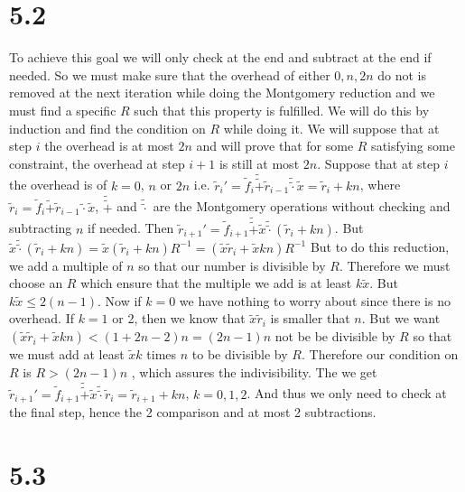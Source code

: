 \documentclass[12pt,a4paper]{article}
\begin{document}
    \section*{5.2}
    To achieve this goal we will only check at the end and subtract at the end if needed. So we must make sure that the overhead of either $0,n,2n$ do not is removed at 
    the next iteration while doing the Montgomery reduction and we 
    must find a specific $R$ such that this property is fulfilled. We will do this by induction and find the condition on $R$ while doing it. 
    We will suppose that at step $i$ the overhead is at most $2n$ and will prove that for some $R$ satisfying some constraint, the overhead at step $i+1$ is still at most $2n$.
    Suppose that at step
    $i$ the overhead is of $k = 0$, $n$ or $2n$ i.e. $\tilde{r}_i' = \tilde{f}_i \tilde{\tilde{+}} \tilde{r}_{i-1} \tilde{\tilde{\cdot}} \tilde{x} = \tilde{r}_i + kn$, 
    where $\tilde{r}_i = \tilde{f}_i \tilde{+} \tilde{r}_{i-1}\tilde{\cdot}\tilde{x} $,
    $\tilde{\tilde{+}}$ and $\tilde{\tilde{\cdot}}$ are the Montgomery operations without checking and subtracting $n$ if needed.
    Then $\tilde{r}_{i+1}' = \tilde{f}_{i+1} \tilde{\tilde{+}} \tilde{x} \tilde{\tilde{\cdot}} (\tilde{r}_i + kn)$. 
    But $\tilde{x} \tilde{\tilde{\cdot}} (\tilde{r}_i + kn) = \tilde{x}(\tilde{r}_i +kn)R^{-1} = (\tilde{x}\tilde{r}_i + \tilde{x}kn)R^{-1}$
    But to do this reduction, we add a multiple of $n$ so that our number is divisible by $R$. Therefore we must choose an $R$ which ensure that the multiple we add is at least $k\tilde{x}$.
    But $k\tilde{x} \leq 2(n-1)$. Now if $k = 0$ we have nothing to worry about since there is no overhead. If $k = 1$ or 2, then we know that $\tilde{x}\tilde{r}_i$ is smaller that $n$.
    But we want $(\tilde{x}\tilde{r}_i + \tilde{x}kn) < (1 + 2n - 2)n = (2n - 1)n$ not be be divisible by $R$ so that we must add at least $\tilde{x}k$ times $n$ to be divisible by $R$.
    Therefore our condition on $R$ is $R > (2n -1)n$ , which assures the indivisibility. 
    The we get $\tilde{r}_{i+1}' = \tilde{f}_{i+1} \tilde{\tilde{+}} \tilde{x} \tilde{\tilde{\cdot}} \tilde{r}_{i}
    = \tilde{r}_{i+1} + kn$, $k=0,1,2$.
    And thus we only need to check at the final step, hence the 2 comparison and at most 2 subtractions.

    \section*{5.3}
\end{document}
